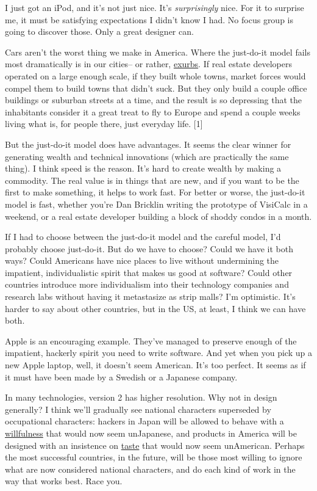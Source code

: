 I just got an iPod, and it's not just nice. It's \emph{surprisingly}
nice. For it to surprise me, it must be satisfying expectations I didn't
know I had. No focus group is going to discover those. Only a great
designer can.

Cars aren't the worst thing we make in America. Where the just-do-it
model fails most dramatically is in our cities-- or rather,
\href{denver.html}{exurbs}. If real estate developers operated on a
large enough scale, if they built whole towns, market forces would
compel them to build towns that didn't suck. But they only build a
couple office buildings or suburban streets at a time, and the result is
so depressing that the inhabitants consider it a great treat to fly to
Europe and spend a couple weeks living what is, for people there, just
everyday life. {[}1{]}

But the just-do-it model does have advantages. It seems the clear winner
for generating wealth and technical innovations (which are practically
the same thing). I think speed is the reason. It's hard to create wealth
by making a commodity. The real value is in things that are new, and if
you want to be the first to make something, it helps to work fast. For
better or worse, the just-do-it model is fast, whether you're Dan
Bricklin writing the prototype of VisiCalc in a weekend, or a real
estate developer building a block of shoddy condos in a month.

If I had to choose between the just-do-it model and the careful model,
I'd probably choose just-do-it. But do we have to choose? Could we have
it both ways? Could Americans have nice places to live without
undermining the impatient, individualistic spirit that makes us good at
software? Could other countries introduce more individualism into their
technology companies and research labs without having it metastasize as
strip malls? I'm optimistic. It's harder to say about other countries,
but in the US, at least, I think we can have both.

Apple is an encouraging example. They've managed to preserve enough of
the impatient, hackerly spirit you need to write software. And yet when
you pick up a new Apple laptop, well, it doesn't seem American. It's too
perfect. It seems as if it must have been made by a Swedish or a
Japanese company.

In many technologies, version 2 has higher resolution. Why not in design
generally? I think we'll gradually see national characters superseded by
occupational characters: hackers in Japan will be allowed to behave with
a \href{gba.html}{willfulness} that would now seem unJapanese, and
products in America will be designed with an insistence on
\href{taste.html}{taste} that would now seem unAmerican. Perhaps the
most successful countries, in the future, will be those most willing to
ignore what are now considered national characters, and do each kind of
work in the way that works best. Race you.

